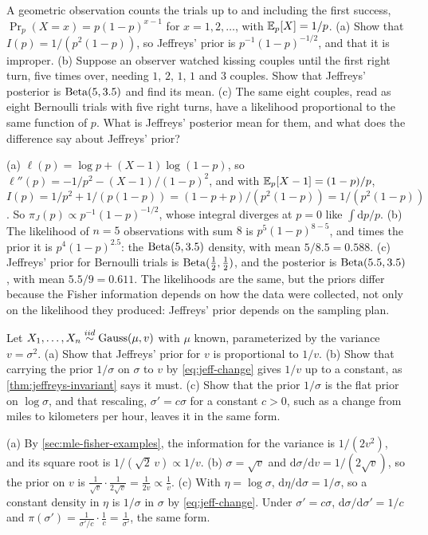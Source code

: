 \begin{exercise}
\label{ex:jeff-geometric}
A geometric observation counts the trials up to and including the first success, $\Pr_p(X = x) = p(1-p)^{x-1}$ for $x = 1, 2, \ldots$, with $\operatorname*{\mathbb{E}}_p[X] = 1/p$. (a) Show that $I(p) = 1/(p^2(1-p))$, so Jeffreys' prior is $p^{-1}(1-p)^{-1/2}$, and that it is improper. (b) Suppose an observer watched kissing couples until the first right turn, five times over, needing $1$, $2$, $1$, $1$ and $3$ couples. Show that Jeffreys' posterior is $\mathrm{Beta}(5, 3.5)$ and find its mean. (c) The same eight couples, read as eight Bernoulli trials with five right turns, have a likelihood proportional to the same function of $p$. What is Jeffreys' posterior mean for them, and what does the difference say about Jeffreys' prior?
\end{exercise}
\begin{solution}
(a) $\ell(p) = \log p + (X - 1)\log(1-p)$, so $\ell''(p) = -1/p^2 - (X - 1)/(1-p)^2$, and with $\operatorname*{\mathbb{E}}_p[X - 1] = (1-p)/p$, $I(p) = 1/p^2 + 1/(p(1-p)) = (1 - p + p)/(p^2(1-p)) = 1/(p^2(1-p))$. So $\pi_J(p) \propto p^{-1}(1-p)^{-1/2}$, whose integral diverges at $p = 0$ like $\int \mathrm{d}p/p$. (b) The likelihood of $n = 5$ observations with sum $8$ is $p^5(1-p)^{8-5}$, and times the prior it is $p^4(1-p)^{2.5}$: the $\mathrm{Beta}(5, 3.5)$ density, with mean $5/8.5 = 0.588$. (c) Jeffreys' prior for Bernoulli trials is $\mathrm{Beta}(\frac12, \frac12)$, and the posterior is $\mathrm{Beta}(5.5, 3.5)$, with mean $5.5/9 = 0.611$. The likelihoods are the same, but the priors differ because the Fisher information depends on how the data were collected, not only on the likelihood they produced: Jeffreys' prior depends on the sampling plan.
\end{solution}

\begin{exercise}
\label{ex:jeff-scale}
Let $X_1, \ldots, X_n \stackrel{iid}{\sim} \text{Gauss}(\mu, v)$ with $\mu$ known, parameterized by the variance $v = \sigma^2$. (a) Show that Jeffreys' prior for $v$ is proportional to $1/v$. (b) Show that carrying the prior $1/\sigma$ on $\sigma$ to $v$ by \cref{eq:jeff-change} gives $1/v$ up to a constant, as \cref{thm:jeffreys-invariant} says it must. (c) Show that the prior $1/\sigma$ is the flat prior on $\log\sigma$, and that rescaling, $\sigma' = c\sigma$ for a constant $c > 0$, such as a change from miles to kilometers per hour, leaves it in the same form.
\end{exercise}
\begin{solution}
(a) By \cref{sec:mle-fisher-examples}, the information for the variance is $1/(2v^2)$, and its square root is $1/(\sqrt{2}\,v) \propto 1/v$. (b) $\sigma = \sqrt{v}$ and $\mathrm{d}\sigma/\mathrm{d}v = 1/(2\sqrt{v})$, so the prior on $v$ is $\frac{1}{\sqrt{v}} \cdot \frac{1}{2\sqrt{v}} = \frac{1}{2v} \propto \frac1v$. (c) With $\eta = \log\sigma$, $\mathrm{d}\eta/\mathrm{d}\sigma = 1/\sigma$, so a constant density in $\eta$ is $1/\sigma$ in $\sigma$ by \cref{eq:jeff-change}. Under $\sigma' = c\sigma$, $\mathrm{d}\sigma/\mathrm{d}\sigma' = 1/c$ and $\pi(\sigma') = \frac{1}{\sigma'/c} \cdot \frac1c = \frac{1}{\sigma'}$, the same form.
\end{solution}

